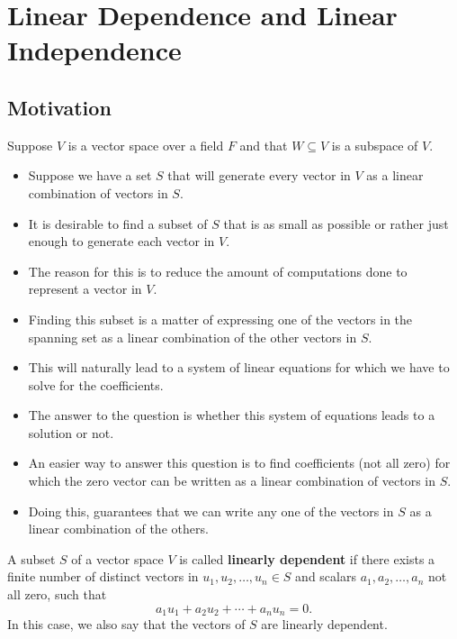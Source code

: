 \section{Linear Dependence and Linear Independence}

\subsection{Motivation}
Suppose \( V  \) is a vector space over a field \( F  \) and that \( W \subseteq V  \) is a subspace of \( V  \). 
\begin{itemize}
    \item Suppose we have a set \( S  \) that will generate every vector in \( V  \) as a linear combination of vectors in \( S  \).
    \item It is desirable to find a subset of \( S  \) that is as small as possible or rather just enough to generate each vector in \( V  \).
    \item The reason for this is to reduce the amount of computations done to represent a vector in \( V  \). 
    \item Finding this subset is a matter of expressing one of the vectors in the spanning set as a linear combination of the other vectors in \( S  \).
    \item This will naturally lead to a system of linear equations for which we have to solve for the coefficients.
    \item The answer to the question is whether this system of equations leads to a solution or not.
    \item An easier way to answer this question is to find coefficients (not all zero) for which the zero vector can be written as a linear combination of vectors in \( S  \).
    \item Doing this, guarantees that we can write any one of the vectors in \( S  \) as a linear combination of the others.
\end{itemize}


\begin{definition}\label{linear dependence}
   A subset \( S  \) of a vector space \( V  \) is called \textbf{linearly dependent} if there exists a finite number of distinct vectors in \( u_{1}, u_{2} , \dots , u_{n} \in S  \) and scalars \( a_{1}, a_{2}, \dots, a_{n}  \) not all zero, such that  
   \[  a_{1} u_{1} + a_{2} u_{2} + \cdots + a_{n} u_{n} = 0.  \]
   In this case, we also say that the vectors of \( S  \) are linearly dependent.
\end{definition}

